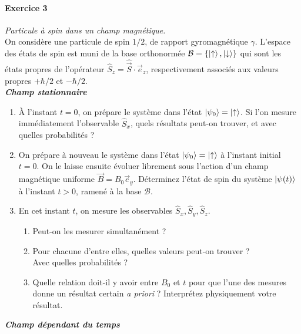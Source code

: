 \paragraph{Exercice 3} \textit{Particule à spin dans un champ magnétique.} \\
On considère une particule de spin $1/2$, de rapport gyromagnétique $\gamma$. L'espace des états de spin est muni de la base orthonormée $\mathcal{B} = \lbrace \ket{\uparrow},\ket{\downarrow}\rbrace$ qui sont les états propres de l'opérateur $\hat S_z = \hat{\vec S}\cdot \vec e_z$, respectivement associés aux valeurs propres $+\hbar/2$ et $-\hbar/2$.\\

\textbf{\textit{Champ stationnaire}}
\begin{enumerate}
\item À l'instant $t=0$, on prépare le système dans l'état $\ket{\psi_0} = \ket{\uparrow}$. Si l'on mesure immédiatement l'observable $\hat S_x$, quels résultats peut-on trouver, et avec quelles probabilités ?
\item On prépare à nouveau le système dans l'état $\ket{\psi_0} = \ket{\uparrow}$ à l'instant initial $t=0$. On le laisse ensuite évoluer librement sous l'action d'un champ magnétique uniforme $\vec B = B_0 \vec e_y$. Déterminez l'état de spin du système $\ket{\psi(t)}$ à l'instant $t>0$, ramené à la base $\mathcal{B}$.
\item En cet instant $t$, on mesure les observables $\hat S_x,\hat S_y,\hat S_z$. 
\begin{enumerate}
\item Peut-on les mesurer simultanément ?
\item Pour chacune d'entre elles, quelles valeurs peut-on trouver ? \\
Avec quelles probabilités ?
\item Quelle relation doit-il y avoir entre $B_0$ et $t$ pour que l'une des mesures donne un résultat certain \textit{a priori} ? Interprétez physiquement votre résultat.
\end{enumerate}
\end{enumerate}
$ $\\
\textbf{\textit{Champ dépendant du temps}}
